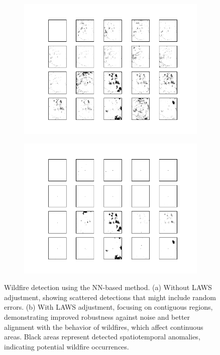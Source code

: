 \documentclass[11pt]{article}
\begin{document}
\begin{figure}[H]
     \centering
     
      \begin{subfigure}[b]{0.45\textwidth}
		\centering
		\includegraphics[width=\textwidth]{../figure/nn_no_laws.png}
		\caption{}
	 \end{subfigure}
         \hfill
      \begin{subfigure}[b]{0.45\textwidth}
         \includegraphics[width=\textwidth]{../figure/nn_laws.png}
         \caption{}
     \end{subfigure}
         \caption{Wildfire detection using the NN-based method. (a) Without LAWS adjustment, showing scattered detections that might include random errors. (b) With LAWS adjustment, focusing on contiguous regions, demonstrating improved robustness against noise and better alignment with the behavior of wildfires, which affect continuous areas. Black areas represent detected spatiotemporal anomalies, indicating potential wildfire occurrences.}
      \label{fig: nn_real_data}
\end{figure}
\end{document}
